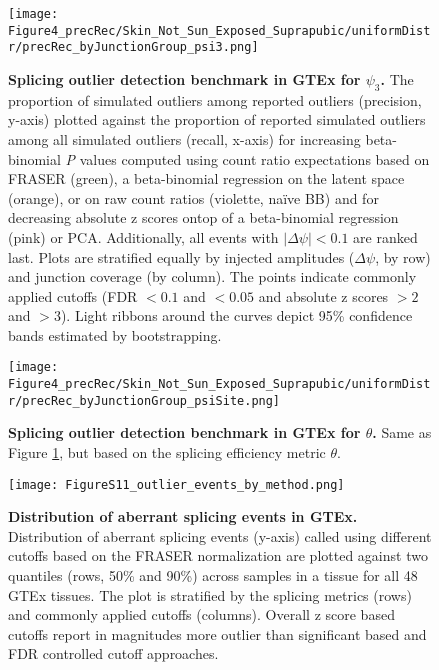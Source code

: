 \documentclass[a4paper,12pt]{article}
\begin{document}
\begin{figure}[h]
	\centering
	\texttt{[image: Figure4\_precRec/Skin\_Not\_Sun\_Exposed\_Suprapubic/uniformDistr/precRec\_byJunctionGroup\_psi3.png]}
	\caption{
	    \textbf{Splicing outlier detection benchmark in GTEx for $\psi_3$.}
	    The proportion of simulated outliers among reported outliers 
(precision, y-axis) plotted against the proportion of reported simulated 
outliers among all simulated outliers (recall, x-axis) for 
increasing beta-binomial \textit{P} values computed using count ratio 
expectations based on FRASER (green), a beta-binomial regression on the 
latent space (orange), or on raw count ratios (violette, na\"ive BB) 
and for decreasing absolute z scores ontop of a beta-binomial regression
(pink) or PCA. Additionally, all events with $|\Delta\psi| < 0.1$ are ranked last.
Plots are stratified equally by injected amplitudes ($\Delta\psi$, by row) 
and junction coverage (by column). The points indicate commonly 
applied cutoffs (FDR $< 0.1$ and $< 0.05$ and absolute z scores $>2$ and $>3$). 
Light ribbons around the curves depict 95\% confidence bands estimated by bootstrapping.
}
\label{fig:Bench3}
\end{figure}
\pagebreak


\begin{figure}[h]
	\centering
	\texttt{[image: Figure4\_precRec/Skin\_Not\_Sun\_Exposed\_Suprapubic/uniformDistr/precRec\_byJunctionGroup\_psiSite.png]}
	\caption{
	    \textbf{Splicing outlier detection benchmark in GTEx for $\theta$.}
	    Same as Figure \ref{fig:Bench3}, but based on the splicing efficiency metric $\theta$.
}
\end{figure}
\pagebreak


\begin{figure}[h]
\centering
	\texttt{[image: FigureS11\_outlier\_events\_by\_method.png]}
	\caption{
	    \textbf{Distribution of aberrant splicing events in GTEx.}
	    Distribution of aberrant splicing events (y-axis) called using different 
	    cutoffs based on the FRASER normalization are plotted against
	    two quantiles (rows, 50\% and 90\%) across samples in a tissue for all 
	    48 GTEx tissues. The plot is stratified by the splicing metrics (rows) and 
	    commonly applied cutoffs (columns). Overall z score based cutoffs report 
	    in magnitudes more outlier than significant based and FDR controlled 
	    cutoff approaches.
}
\end{figure}
\pagebreak
\end{document}
